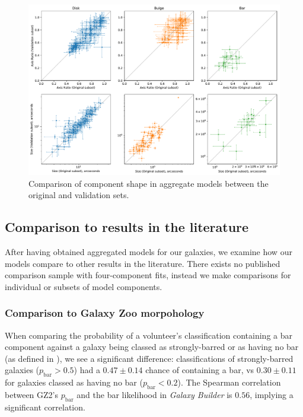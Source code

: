 \documentclass[../main.tex]{subfiles}
\begin{document}
\begin{figure}
  \includegraphics[width=17.3cm]{images__results/component_sizing.pdf}
  \caption{Comparison of component shape in aggregate models between the original and validation sets.}
  \label{fig:aggregate_model_consistency}
\end{figure}

\subsection{Comparison to results in the literature}


After having obtained aggregated models for our galaxies, we examine how our models compare to other results in the literature. There exists no published comparison sample with four-component fits, instead we make comparisons for individual or subsets of model components.

\subsubsection{Comparison to Galaxy Zoo morpohology}

When comparing the probability of a volunteer's classification containing a bar component against a galaxy being classed as strongly-barred or as having no bar (as defined in \citealt{Masters2010:1003.0449v2}), we see a significant difference: classifications of strongly-barred galaxies ($p_\text{bar} > 0.5$) had a $0.47 \pm 0.14$ chance of containing a bar, vs $0.30 \pm 0.11$ for galaxies classed as having no bar ($p_\text{bar} < 0.2$). The Spearman correlation between GZ2's $p_\text{bar}$ and the bar likelihood in \textit{Galaxy Builder} is $0.56$, implying a significant correlation.
\end{document}
